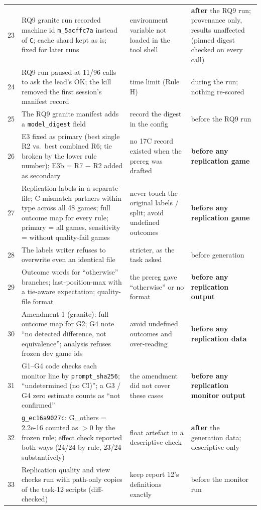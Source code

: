 \documentclass[conference]{IEEEtran}
\begin{document}
{\begin{supertabular}{@{}p{0.05\columnwidth}p{0.36\columnwidth}p{0.25\columnwidth}p{0.26\columnwidth}@{}}
23 & RQ9 granite run recorded machine id \texttt{m\_5acffc7a} instead of \texttt{C}; cache shard kept as is; fixed for later runs & environment variable not loaded in the tool shell & \textbf{after} the RQ9 run; provenance only, results unaffected (pinned digest checked on every call)\\
24 & RQ9 run paused at 11/96 calls to ask the lead's OK; the kill removed the first session's manifest record & time limit (Rule H) & during the run; nothing re-scored\\
25 & The RQ9 granite manifest adds a \texttt{model\_digest} field & record the digest in the config & before the RQ9 run\\
26 & E3 fixed as primary (best single R2 vs.\ best combined R6; tie broken by the lower rule number); E3b = R7 $-$ R2 added as secondary & no 17C record existed when the prereg was drafted & \textbf{before any replication game}\\
27 & Replication labels in a separate file; C-mismatch partners within type across all 48 games; full outcome map for every rule; primary = all games, sensitivity = without quality-fail games & never touch the original labels / split; avoid undefined outcomes & \textbf{before any replication game}\\
28 & The labels writer refuses to overwrite even an identical file & stricter, as the task asked & before generation\\
29 & Outcome words for ``otherwise'' branches; last-position-max with a tie-aware expectation; quality-file format & the prereg gave ``otherwise'' or no format & \textbf{before any replication output}\\
30 & Amendment 1 (granite): full outcome map for G2; G4 note ``no detected difference, not equivalence''; analysis refuses frozen dev game ids & avoid undefined outcomes and over-reading & \textbf{before any replication data}\\
31 & G1--G4 code checks each monitor line by \texttt{prompt\_sha256}; ``undetermined (no CI)''; a G3 / G4 zero estimate counts as ``not confirmed'' & the amendment did not cover these cases & \textbf{before any replication monitor output}\\
32 & \texttt{g\_ec16a9027c}: G\_others = 2.2e-16 counted as $>0$ by the frozen rule; effect check reported both ways (24/24 by rule, 23/24 substantively) & float artefact in a descriptive check & \textbf{after} the generation data; descriptive only\\
33 & Replication quality and view checks run with path-only copies of the task-12 scripts (diff-checked) & keep report 12's definitions exactly & before the monitor run\\

\end{supertabular}}
\end{document}
